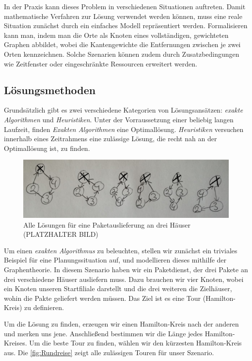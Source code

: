 \documentclass{article}
\begin{document}
In der Praxis kann dieses Problem in verschiedenen Situationen auftreten. Damit mathematische Verfahren zur Lösung verwendet werden können, muss eine reale Situation zunächst durch ein einfaches Modell repräsentiert werden. Formalisieren kann man, indem man die Orte als Knoten eines vollständigen, gewichteten Graphen abbildet, wobei die Kantengewichte die
Entfernungen zwischen je zwei Orten kennzeichnen. Solche Szenarien können zudem durch Zusatzbedingungen wie Zeitfenster oder eingeschränkte Ressourcen erweitert werden.

\subsection{Lösungsmethoden}

Grundsätzlich gibt es zwei verschiedene Kategorien von Lösungsansätzen: \textit{exakte Algorithmen} und \textit{Heuristiken}. Unter der Vorraussetzung einer beliebig langen Laufzeit, finden \textit{Exakten Algorithmen} eine Optimallösung. \textit{Heuristiken} versuchen innerhalb eines Zeitrahmens eine zulässige Lösung, die recht nah an der Optimallösung ist, zu finden.

\begin{figure}[H]
	\centering
	\includegraphics[width=1\textwidth]{Graphen.png}
	\caption{Alle Lösungen für eine Paketauslieferung an drei Häuser (PLATZHALTER BILD)}
	\label{fig:Rundreise}
\end{figure}

Um einen \textit{exakten Algorithmus} zu beleuchten, stellen wir zunächst ein triviales Beispiel für eine Planungssituation auf, und modellieren dieses mithilfe der Graphentheorie. In diesem Szenario haben wir ein Paketdienst, der drei Pakete an drei verschiedene Häuser ausliefern muss. Dazu brauchen wir vier Knoten, wobei ein Knoten unseren Startfiliale darstellt und die drei weiteren die Zielhäuser, wohin die Pakte geliefert werden müssen. Das Ziel ist es eine Tour (Hamilton-Kreis) zu definieren.
\par Um die Lösung zu finden, erzeugen wir einen Hamilton-Kreis nach der anderen und merken uns jene. Anschließend bestimmen wir die Länge jedes Hamilton-Kreises. Um die beste Tour zu finden, wählen wir den kürzesten Hamilton-Kreis aus. Die \autoref{fig:Rundreise} zeigt alle zulässigen Touren für unser Szenario.
\end{document}
